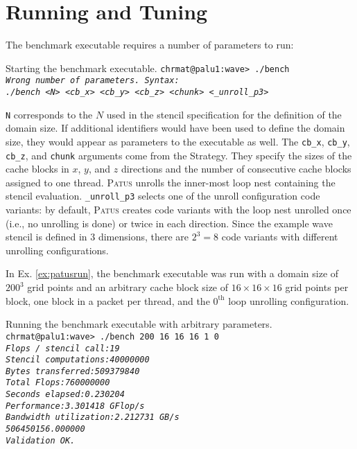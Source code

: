 \section{Running and Tuning}

The benchmark executable requires a number of parameters to run:

\begin{example}{Starting the benchmark executable.}
	\footnotesize
	\noindent\texttt{chrmat@palu1:wave> ./bench\\
	\textit{Wrong number of parameters. Syntax:\\
	./bench <N> <cb\_x> <cb\_y> <cb\_z> <chunk> <\_unroll\_p3>}}
\end{example}

\texttt{N} corresponds to the $N$ used in the stencil specification for the definition of the domain size.
If additional identifiers would have been used to define the domain size, they would appear as parameters to
the executable as well. The \texttt{cb\_x}, \texttt{cb\_y}, \texttt{cb\_z}, and \texttt{chunk} arguments come from the
Strategy. They specify the sizes of the cache blocks in $x$, $y$, and $z$ directions and the number of consecutive
cache blocks assigned to one thread.
\textsc{Patus} unrolls the inner-most loop nest containing the stencil evaluation. \texttt{\_unroll\_p3}
selects one of the unroll configuration code variants: by default, \textsc{Patus} creates code variants
with the loop nest unrolled once (i.e., no unrolling is done) or twice in each direction. Since the example
wave stencil is defined in $3$ dimensions, there are $2^3=8$ code variants with different unrolling configurations.

In Ex. \ref{ex:patusrun}, the benchmark executable was run with a domain size of $200^3$ grid points
and an arbitrary cache block size of $16\times 16 \times 16$ grid points per block, one block in a packet per
thread, and the $0^{\text{th}}$ loop unrolling configuration.

\begin{example}{Running the benchmark executable with arbitrary parameters.}
	\label{ex:patusrun}
	\footnotesize
	\noindent\texttt{chrmat@palu1:wave> ./bench 200 16 16 16 1 0\\
	\textit{Flops / stencil call:\phantom{XX}19\\
	Stencil computations:\phantom{XX}40000000\\
	Bytes transferred:\phantom{XXXXX}509379840\\
	Total Flops:\phantom{XXXXXXXXXXX}760000000\\
	Seconds elapsed:\phantom{XXXXXXX}0.230204\\
	Performance:\phantom{XXXXXXXXXXX}3.301418 GFlop/s\\
	Bandwidth utilization:\phantom{X}2.212731 GB/s\\
	506450156.000000\\
	Validation OK.}}
\end{example}

